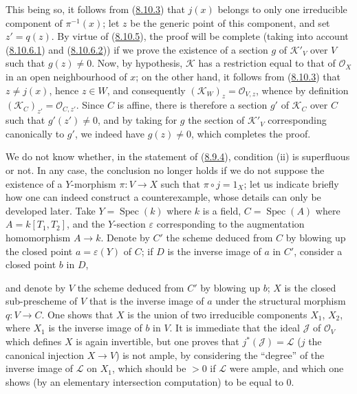 \begin{env}[8.10.6]
This being so, it follows from (\hyperref[II.8.10.3]{8.10.3}) that $j(x)$
belongs to only one irreducible component of $\pi^{-1}(x)$; let $z$ be the
generic point of this component, and set $z'=q(z)$. By virtue of
(\hyperref[II.8.10.5]{8.10.5}), the proof will be complete (taking into
account (\hyperref[II.8.10.6.1]{8.10.6.1}) and
(\hyperref[II.8.10.6.2]{8.10.6.2})) if we prove the existence of a
section $g$ of $\mathcal{K}'_V$ over $V$ such that $g(z)\neq0$. Now,
by hypothesis, $\mathcal{K}$ has a restriction equal to that of
$\mathcal{O}_X$ in an open neighbourhood of $x$; on the other hand, it follows
from (\hyperref[II.8.10.3]{8.10.3}) that $z\neq j(x)$, hence $z\in W$, and
consequently $(\mathcal{K}_W)_z=\mathcal{O}_{V,z}$, whence by definition
$(\mathcal{K}_C)_{z'}=\mathcal{O}_{C,z'}$. Since $C$ is affine, there is
therefore a section $g'$ of $\mathcal{K}_C$ over $C$ such that
$g'(z')\neq0$, and by taking for $g$ the section of $\mathcal{K}'_V$
corresponding canonically to $g'$, we indeed have $g(z)\neq0$, which completes
the proof.
\end{env}

\begin{remark}[8.10.7]
\label{II.8.10.7}
We do not know whether, in the statement of (\hyperref[II.8.9.4]{8.9.4}),
condition (ii) is superfluous or not. In any case, the conclusion no longer
holds if we do not suppose the existence of a $Y$-morphism $\pi:V\to X$ such
that $\pi\circ j=1_X$; let us indicate briefly how one can indeed construct
a counterexample, whose details can only be developed later.
Take $Y=\operatorname{Spec}(k)$ where $k$ is a field,
$C=\operatorname{Spec}(A)$ where $A=k[T_1,T_2]$, and the $Y$-section
$\varepsilon$ corresponding to the augmentation homomorphism $A\to k$. Denote
by $C'$ the scheme deduced from $C$ by blowing up the closed point
$a=\varepsilon(Y)$ of $C$; if $D$ is the inverse image of $a$ in $C'$,
consider a closed point $b$ in $D$,

and denote by $V$ the scheme deduced from $C'$ by blowing up $b$; $X$ is
the closed sub-prescheme of $V$ that is the inverse image of $a$ under the
structural morphism $q:V\to C$. One shows that $X$ is the union of two
irreducible components $X_1$, $X_2$, where $X_1$ is the inverse image of $b$
in $V$. It is immediate that the ideal $\mathcal{J}$ of $\mathcal{O}_V$ which
defines $X$ is again invertible, but one proves that
$j^*(\mathcal{J})=\mathcal{L}$ ($j$ the canonical injection $X\to V$) is not
ample, by considering the ``degree'' of the inverse image of
$\mathcal{L}$ on $X_1$, which should be $>0$ if $\mathcal{L}$ were ample,
and which one shows (by an elementary intersection computation) to be
equal to 0.
\end{remark}

